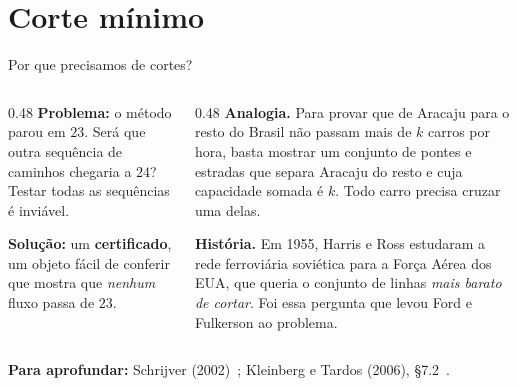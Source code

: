 \documentclass[aspectratio=169,xcolor=table]{beamer}
\newcommand{\fonte}[1]{%
  \vfill
  {\tiny\color{gray!55!black}\textbf{Para aprofundar:} #1\par}%
}
\begin{document}
\section{Corte mínimo}

\begin{frame}{Por que precisamos de cortes?}
  \begin{columns}[T]
    \begin{column}{0.48\textwidth}
      \textbf{Problema:} o método parou em $23$. Será que outra sequência de caminhos chegaria
      a $24$? Testar todas as sequências é inviável.
      \medskip

      \textbf{Solução:} um \textbf{certificado}, um objeto fácil de conferir que mostra que
      \emph{nenhum} fluxo passa de $23$.
    \end{column}
    \begin{column}{0.48\textwidth}
      \scriptsize
      \textbf{Analogia.} Para provar que de Aracaju para o resto do Brasil não passam mais de
      $k$ carros por hora, basta mostrar um conjunto de pontes e estradas que separa Aracaju do
      resto e cuja capacidade somada é $k$. Todo carro precisa cruzar uma delas.
      \medskip

      \textbf{História.} Em 1955, Harris e Ross estudaram a rede ferroviária soviética para a
      Força Aérea dos EUA, que queria o conjunto de linhas \emph{mais barato de cortar}. Foi
      essa pergunta que levou Ford e Fulkerson ao problema.
    \end{column}
  \end{columns}
  \fonte{Schrijver (2002)~\cite{schrijver2002history};
    Kleinberg e Tardos (2006), \S 7.2~\cite{kleinberg2006algorithm}.}
\end{frame}
\end{document}
